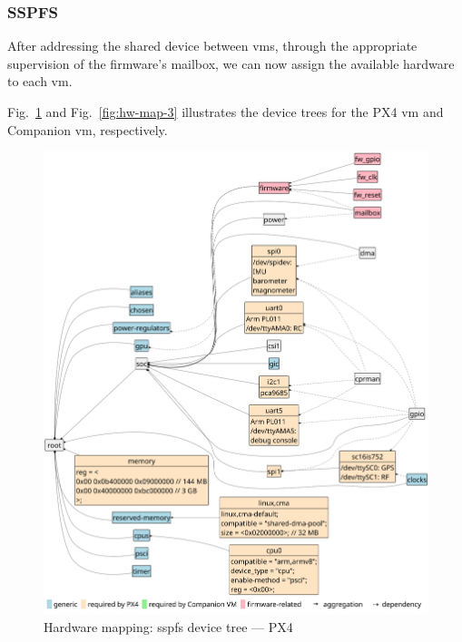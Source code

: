 \subsubsection{SSPFS}
\label{sec:final-scenario}
After addressing the shared device between \glspl{vm}, through the appropriate
supervision of the firmware's mailbox, we can now assign the available hardware
to each \gls{vm}.

Fig.~\ref{fig:hw-map-2} and Fig.~\ref{fig:hw-map-3} illustrates the device trees
for the PX4 \gls{vm} and Companion \gls{vm}, respectively.

\begin{figure}[!hbt]
  \centering
  \includegraphics[width=1.0\textwidth]{./img/pdf/hw-map-2} 
  \caption[Hardware mapping: SSPFS device tree --- PX4]{Hardware mapping:
  \gls{sspfs} device tree --- PX4}%
  \label{fig:hw-map-2}
\end{figure}

